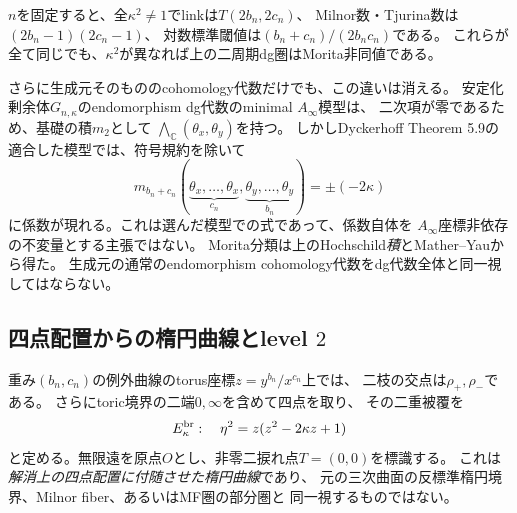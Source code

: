 \begin{corollary}[固定された位相型の内部の連続な圏的modulus]
$n$を固定すると、全$\kappa^2\ne1$でlinkは$T(2b_n,2c_n)$、
Milnor数・Tjurina数は$(2b_n-1)(2c_n-1)$、
対数標準閾値は$(b_n+c_n)/(2b_nc_n)$である。
これらが全て同じでも、$\kappa^2$が異なれば上の二周期dg圏はMorita非同値である。
\end{corollary}

さらに生成元そのもののcohomology代数だけでも、この違いは消える。
安定化剰余体$G_{n,\kappa}$のendomorphism dg代数のminimal $A_\infty$模型は、
二次項が零であるため、基礎の積$m_2$として
$\bigwedge_{\mathbb C}(\theta_x,\theta_y)$を持つ。
しかしDyckerhoff Theorem 5.9の適合した模型では、符号規約を除いて
\[
 m_{b_n+c_n}(\underbrace{\theta_x,\ldots,\theta_x}_{c_n},
                     \underbrace{\theta_y,\ldots,\theta_y}_{b_n})
       =\pm(-2\kappa)
\]
に係数が現れる。これは選んだ模型での式であって、係数自体を
$A_\infty$座標非依存の不変量とする主張ではない。
Morita分類は上のHochschild\emph{積}とMather--Yauから得た。
生成元の通常のendomorphism cohomology代数をdg代数全体と同一視してはならない。

\subsection{四点配置からの楕円曲線とlevel \texorpdfstring{$2$}{2}}
重み$(b_n,c_n)$の例外曲線のtorus座標$z=y^{b_n}/x^{c_n}$上では、
二枝の交点は$\rho_+,\rho_-$である。
さらにtoric境界の二端$0,\infty$を含めて四点を取り、
その二重被覆を
\begin{equation}\label{eq:boundary-level-two-elliptic}
 E^{\rm br}_\kappa:\quad \eta^2=z(z^2-2\kappa z+1)
\end{equation}
と定める。無限遠を原点$O$とし、非零二捩れ点$T=(0,0)$を標識する。
これは\emph{解消上の四点配置に付随させた楕円曲線}であり、
元の三次曲面の反標準楕円境界、Milnor fiber、あるいはMF圏の部分圏と
同一視するものではない。

